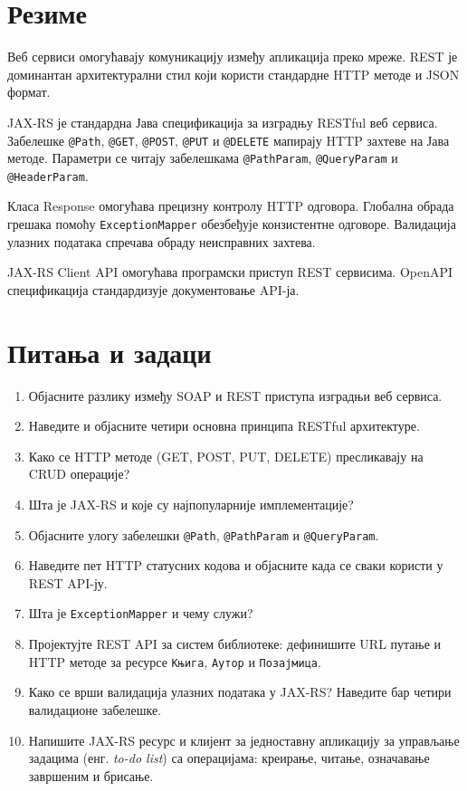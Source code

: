 \section{Резиме}

Веб сервиси омогућавају комуникацију између апликација преко мреже. REST је доминантан архитектурални стил који користи стандардне HTTP методе и JSON формат.

JAX-RS је стандардна Јава спецификација за изградњу RESTful веб сервиса. Забелешке \texttt{@Path}, \texttt{@GET}, \texttt{@POST}, \texttt{@PUT} и \texttt{@DELETE} мапирају HTTP захтеве на Јава методе. Параметри се читају забелешкама \texttt{@PathParam}, \texttt{@QueryParam} и \texttt{@HeaderParam}.

Класа Response омогућава прецизну контролу HTTP одговора. Глобална обрада грешака помоћу \texttt{ExceptionMapper} обезбеђује конзистентне одговоре. Валидација улазних података спречава обраду неисправних захтева.

JAX-RS Client API омогућава програмски приступ REST сервисима. OpenAPI спецификација стандардизује документовање API-ја.


\section{Питања и задаци}

\begin{enumerate}
\item Објасните разлику између SOAP и REST приступа изградњи веб сервиса.
\item Наведите и објасните четири основна принципа RESTful архитектуре.
\item Како се HTTP методе (GET, POST, PUT, DELETE) пресликавају на CRUD операције?
\item Шта је JAX-RS и које су најпопуларније имплементације?
\item Објасните улогу забелешки \texttt{@Path}, \texttt{@PathParam} и \texttt{@QueryParam}.
\item Наведите пет HTTP статусних кодова и објасните када се сваки користи у REST API-ју.
\item Шта је \texttt{ExceptionMapper} и чему служи?
\item Пројектујте REST API за систем библиотеке: дефинишите URL путање и HTTP методе за ресурсе \texttt{Књига}, \texttt{Аутор} и \texttt{Позајмица}.
\item Како се врши валидација улазних података у JAX-RS? Наведите бар четири валидационе забелешке.
\item Напишите JAX-RS ресурс и клијент за једноставну апликацију за управљање задацима (енг. \textit{to-do list}) са операцијама: креирање, читање, означавање завршеним и брисање.
\end{enumerate}

